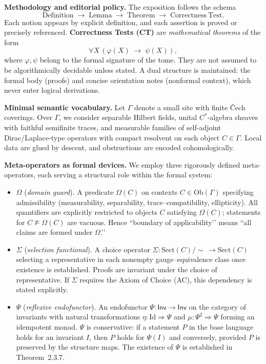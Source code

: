 \vspace{0.5em}
\noindent\textbf{Methodology and editorial policy.}
The exposition follows the schema
\[
\mathrm{Definition} \;\longrightarrow\; \mathrm{Lemma} \;\longrightarrow\; \mathrm{Theorem} \;\longrightarrow\; \mathrm{Correctness\ Test}.
\]
Each notion appears by explicit definition, and each assertion is proved or precisely referenced.
\textbf{Correctness Tests (CT)} are \emph{mathematical theorems} of the form
\[
\forall X\,(\varphi(X)\;\rightarrow\;\psi(X)),
\]
where \(\varphi,\psi\) belong to the formal signature of the tome.
They are not assumed to be algorithmically decidable unless stated.  
A dual structure is maintained: the formal body (proofs) and concise orientation notes (nonformal context), which never enter logical derivations.

\vspace{0.5em}
\noindent\textbf{Minimal semantic vocabulary.}
Let \(\Gamma\) denote a small site with finite Čech coverings.
Over \(\Gamma\), we consider separable Hilbert fields, unital \(C^\ast\)-algebra sheaves with faithful semifinite traces, 
and measurable families of self-adjoint Dirac/Laplace-type operators with compact resolvent on each object \(C\in\Gamma\).
Local data are glued by descent, and obstructions are encoded cohomologically.

\vspace{0.5em}
\noindent\textbf{Meta-operators as formal devices.}
We employ three rigorously defined meta-operators, each serving a structural role within the formal system:

\begin{itemize}
  \item \textbf{\(\Omega\)} (\emph{domain guard}). A predicate \(\Omega(C)\) on contexts \(C\in\mathrm{Ob}(\Gamma)\) specifying admissibility 
  (measurability, separability, trace–compatibility, ellipticity).  
  All quantifiers are explicitly restricted to objects \(C\) satisfying \(\Omega(C)\);  
  statements for \(C\not\models\Omega(C)\) are vacuous.  
  Hence “boundary of applicability’’ means “all claims are formed under \(\Omega\).’’
  
  \item \textbf{\(\Sigma\)} (\emph{selection functional}). A choice operator
  \(\Sigma:\mathrm{Sect}(C)/\!\sim\,\to \mathrm{Sect}(C)\)
  selecting a representative in each nonempty gauge–equivalence class once existence is established.  
  Proofs are invariant under the choice of representative.
  If \(\Sigma\) requires the Axiom of Choice (AC), this dependency is stated explicitly.

  \item \textbf{\(\Psi\)} (\emph{reflexive endofunctor}).  
  An endofunctor \(\Psi:\mathsf{Inv}\to\mathsf{Inv}\) on the category of invariants with natural transformations 
  \(\eta:\mathrm{Id}\Rightarrow\Psi\) and \(\mu:\Psi^2\Rightarrow\Psi\) forming an idempotent monad.  
  \(\Psi\) is conservative: if a statement \(P\) in the base language holds for an invariant \(I\), then \(P\) holds for \(\Psi(I)\) and conversely, provided \(P\) is preserved by the structure maps.  
  The existence of \(\Psi\) is established in Theorem~2.3.7.
\end{itemize}

